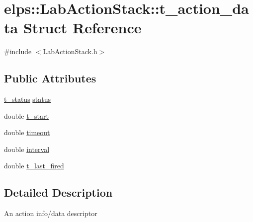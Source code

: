 \hypertarget{structelps_1_1_lab_action_stack_1_1t__action__data}{\section{elps\+:\+:Lab\+Action\+Stack\+:\+:t\+\_\+action\+\_\+data Struct Reference}
\label{structelps_1_1_lab_action_stack_1_1t__action__data}
}


{\ttfamily \#include $<$Lab\+Action\+Stack.\+h$>$}

\subsection*{Public Attributes}
\begin{DoxyCompactItemize}
\item 
\hyperlink{classelps_1_1_lab_action_stack_a869b84c38d157b66a589f5b7bf2c447d}{t\+\_\+status} \hyperlink{structelps_1_1_lab_action_stack_1_1t__action__data_ae1da3e7f507a4c2266dd815a4d729575}{status}
\item 
double \hyperlink{structelps_1_1_lab_action_stack_1_1t__action__data_a5912a70c6e7288f82141238ef1bbeb09}{t\+\_\+start}
\item 
double \hyperlink{structelps_1_1_lab_action_stack_1_1t__action__data_af2d25275bc009b026306bb8d847a1129}{timeout}
\item 
double \hyperlink{structelps_1_1_lab_action_stack_1_1t__action__data_ab7ed5a859298170fb29075a8ae579d51}{interval}
\item 
double \hyperlink{structelps_1_1_lab_action_stack_1_1t__action__data_a692a5e74dd664d0da5ea2a74961000ec}{t\+\_\+last\+\_\+fired}
\end{DoxyCompactItemize}


\subsection{Detailed Description}
An action info/data descriptor 

